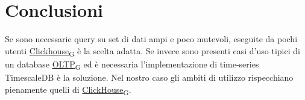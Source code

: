 \section{Conclusioni}
Se sono necessarie query su set di dati ampi e poco mutevoli, eseguite da pochi utenti \href{https://7last.github.io/docs/pb/documentazione-interna/glossario\#clickhouse}{Clickhouse\textsubscript{G}} è la scelta adatta.
Se invece sono presenti casi d’uso tipici di un database \href{https://7last.github.io/docs/pb/documentazione-interna/glossario\#online-transaction-processing}{OLTP\textsubscript{G}} ed è necessaria l'implementazione di time-series TimescaleDB è la soluzione.
Nel nostro caso gli ambiti di utilizzo rispecchiano pienamente quelli di \href{https://7last.github.io/docs/pb/documentazione-interna/glossario\#clickhouse}{ClickHouse\textsubscript{G}}.





